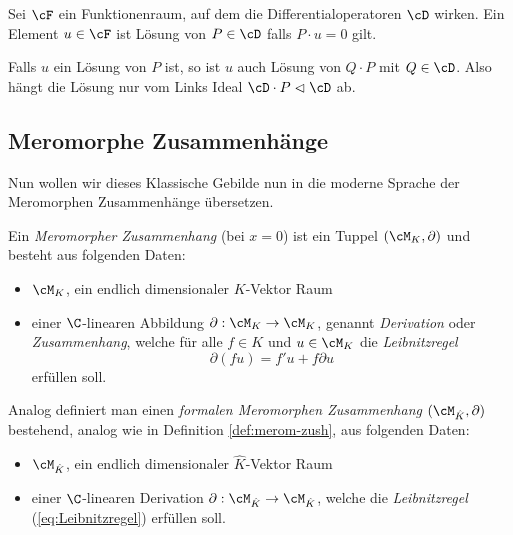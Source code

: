 \cite[3.1.1]{sabbah_cimpa90} Sei $\cF$ ein Funktionenraum, auf dem die
Differentialoperatoren $\cD$ wirken. Ein Element $u\in \cF$ ist Lösung von
$P\in\cD$ falls $P\cdot u=0$ gilt.

Falls $u$ ein Lösung von $P$ ist, so ist $u$ auch Lösung von $Q\cdot P$ mit
$Q\in \cD$. Also hängt die Lösung nur vom Links Ideal $\cD\cdot
P\vartriangleleft\cD$ ab.

\subsection{Meromorphe Zusammenhänge}
Nun wollen wir dieses Klassische Gebilde nun in die moderne Sprache der
Meromorphen Zusammenhänge übersetzen.
\begin{defn} \label{def:merom-zush}
Ein \emph{Meromorpher Zusammenhang} (bei $x=0$) ist ein Tuppel
$(\cM_K,\partial)$ und besteht aus folgenden Daten:
\begin{itemize}
\item $\cM_K$, ein endlich dimensionaler $K$-Vektor Raum
\item einer $\C$-linearen Abbildung $\partial:\cM_K\rightarrow \cM_K$,
genannt \emph{Derivation} oder \emph{Zusammenhang}, welche für alle $f\in K$
und $u\in \cM_K$ die \emph{Leibnitzregel}
\begin{equation}\label{eq:Leibnitzregel}
\partial(fu)=f'u+f\partial u %
\end{equation}
erfüllen soll.
\end{itemize}
\end{defn}
\begin{bem}
Analog definiert man einen \emph{formalen Meromorphen Zusammenhang}
$(\cM_{\hat K},\partial)$ bestehend, analog wie in Definition
\ref{def:merom-zush}, aus folgenden Daten:
\begin{itemize}
\item $\cM_{\hat K}$, ein endlich dimensionaler $\hat K$-Vektor Raum
\item einer $\C$-linearen Derivation $\partial:\cM_{\hat K}\rightarrow
\cM_{\hat K}$, welche die \emph{Leibnitzregel} (\ref{eq:Leibnitzregel})
erfüllen soll.
\end{itemize}
\end{bem}

